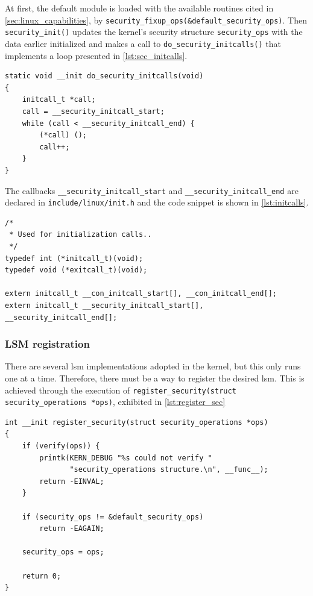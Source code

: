 At first, the default module is loaded with the available routines cited in \autoref{sec:linux_capabilities}, by \texttt{security\_fixup\_ops(\&default\_security\_ops)}. Then \texttt{security\_init()} updates the kernel's security structure \texttt{security\_ops} with the data earlier initialized and makes a call to \texttt{do\_security\_initcalls()} that implements a loop presented in \autoref{lst:sec_initcalls}.

\begin{lstlisting}[style=CInputStyle, caption=\texttt{do\_security\_initcalls} function (Linux kernel v3.11), label=lst:sec_initcalls]
static void __init do_security_initcalls(void)
{
	initcall_t *call;
	call = __security_initcall_start;
	while (call < __security_initcall_end) {
		(*call) ();
		call++;
	}
}
\end{lstlisting}

The callbacks \texttt{\_\_security\_initcall\_start} and \texttt{\_\_security\_initcall\_end} are declared in \texttt{include/linux/init.h} and the code snippet is shown in \autoref{lst:initcalls}.

\begin{lstlisting}[style=CInputStyle, caption=\texttt{init} callbacks (Linux kernel v3.11), label=lst:initcalls]
/*
 * Used for initialization calls..
 */
typedef int (*initcall_t)(void);
typedef void (*exitcall_t)(void);

extern initcall_t __con_initcall_start[], __con_initcall_end[];
extern initcall_t __security_initcall_start[], __security_initcall_end[];
\end{lstlisting}

\subsubsection{LSM registration}
There are several \gls{lsm} implementations adopted in the kernel, but this only runs one at a time. Therefore, there must be a way to register the desired \gls{lsm}. This is achieved through the execution of \texttt{register\_security(struct security\_operations *ops)}, exhibited in \autoref{lst:register_sec}

\begin{lstlisting}[style=CInputStyle, caption=\texttt{register\_security} function (Linux kernel v3.11), label=lst:register_sec]
int __init register_security(struct security_operations *ops)
{
	if (verify(ops)) {
		printk(KERN_DEBUG "%s could not verify "
		       "security_operations structure.\n", __func__);
		return -EINVAL;
	}

	if (security_ops != &default_security_ops)
		return -EAGAIN;

	security_ops = ops;

	return 0;
}
\end{lstlisting}

